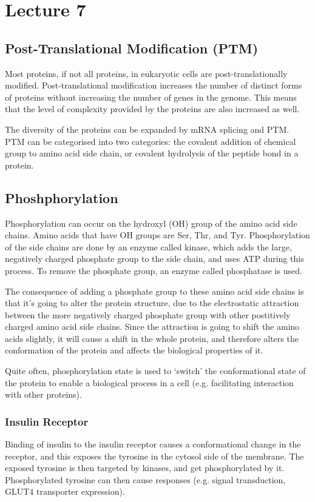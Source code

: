 \documentclass[a4paper, 12pt]{report}
\newcommand{\mychapter}[2]{
    \setcounter{chapter}{#1}
    \setcounter{section}{0}
    \chapter*{#2}
    \addcontentsline{toc}{chapter}{#2}
}
\begin{document}
\mychapter{7}{Lecture 7}

\section{Post-Translational Modification (PTM)}

Most proteins, if not all proteins, in eukaryotic cells are post-translationally modified.
Post-translational modification increases the number of distinct forms of proteins without increasing the number of genes in the genome.
This means that the level of complexity provided by the proteins are also increased as well.

The diversity of the proteins can be expanded by mRNA splicing and PTM.
PTM can be categorised into two categories: the covalent addition of chemical group to amino acid side chain, or covalent hydrolysis of the peptide bond in a protein.

\section{Phoshphorylation}

Phosphorylation can occur on the hydroxyl (OH) group of the amino acid side chains.
Amino acids that have OH groups are Ser, Thr, and Tyr.
Phosphorylation of the side chains are done by an enzyme called kinase, which adds the large, negatively charged phosphate group to the side chain, and uses ATP during this process.
To remove the phosphate group, an enzyme called phosphatase is used.

The consequence of adding a phosphate group to these amino acid side chains is that it's going to alter the protein structure, due to the electrostatic attraction between the more negatively charged phosphate group with other postitively charged amino acid side chains.
Since the attraction is going to shift the amino acids slightly, it will cause a shift in the whole protein, and therefore alters the conformation of the protein and affects the biological properties of it.

Quite often, phosphorylation state is used to `switch' the conformational state of the protein to enable a biological process in a cell (e.g. facilitating interaction with other proteins).

\subsection{Insulin Receptor}

Binding of insulin to the insulin receptor causes a conformational change in the receptor, and this exposes the tyrosine in the cytosol side of the membrane.
The exposed tyrosine is then targeted by kinases, and get phosphorylated by it.
Phosphorylated tyrosine can then cause responses (e.g. signal transduction, GLUT4 transporter expression).
\end{document}
